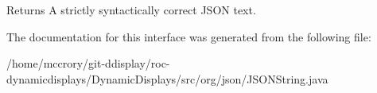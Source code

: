 \begin{DoxyReturn}{Returns}
A strictly syntactically correct J\-S\-O\-N text. 
\end{DoxyReturn}


The documentation for this interface was generated from the following file\-:\begin{DoxyCompactItemize}
\item 
/home/mccrory/git-\/ddisplay/roc-\/dynamicdisplays/\-Dynamic\-Displays/src/org/json/J\-S\-O\-N\-String.\-java\end{DoxyCompactItemize}
